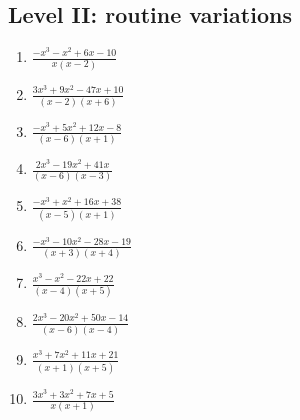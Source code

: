 \documentclass[11pt,oneside]{book}
\begin{document}
\subsection*{Level II: routine variations}
\begin{enumerate}[leftmargin=*,label=\textbf{\arabic*.},itemsep=0.65\baselineskip]
\item $\displaystyle \frac{- x^{3} - x^{2} + 6 x - 10}{x \left(x - 2\right)}$
\item $\displaystyle \frac{3 x^{3} + 9 x^{2} - 47 x + 10}{\left(x - 2\right) \left(x + 6\right)}$
\item $\displaystyle \frac{- x^{3} + 5 x^{2} + 12 x - 8}{\left(x - 6\right) \left(x + 1\right)}$
\item $\displaystyle \frac{2 x^{3} - 19 x^{2} + 41 x}{\left(x - 6\right) \left(x - 3\right)}$
\item $\displaystyle \frac{- x^{3} + x^{2} + 16 x + 38}{\left(x - 5\right) \left(x + 1\right)}$
\item $\displaystyle \frac{- x^{3} - 10 x^{2} - 28 x - 19}{\left(x + 3\right) \left(x + 4\right)}$
\item $\displaystyle \frac{x^{3} - x^{2} - 22 x + 22}{\left(x - 4\right) \left(x + 5\right)}$
\item $\displaystyle \frac{2 x^{3} - 20 x^{2} + 50 x - 14}{\left(x - 6\right) \left(x - 4\right)}$
\item $\displaystyle \frac{x^{3} + 7 x^{2} + 11 x + 21}{\left(x + 1\right) \left(x + 5\right)}$
\item $\displaystyle \frac{3 x^{3} + 3 x^{2} + 7 x + 5}{x \left(x + 1\right)}$
\end{enumerate}
\end{document}
